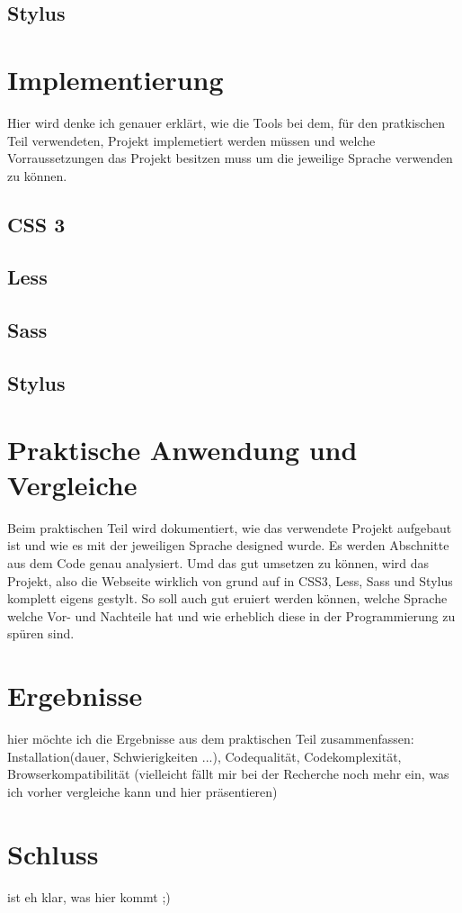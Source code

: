 \subsection{Stylus}

\section{Implementierung}
Hier wird denke ich genauer erklärt, wie die Tools bei dem, für den pratkischen Teil verwendeten, Projekt implemetiert werden müssen und welche  Vorraussetzungen das Projekt besitzen muss um die jeweilige Sprache verwenden zu können.

\subsection{CSS 3}

\subsection{Less}

\subsection{Sass}

\subsection{Stylus}


\section{Praktische Anwendung und Vergleiche}
Beim praktischen Teil wird dokumentiert, wie das verwendete Projekt aufgebaut ist und wie es mit der jeweiligen Sprache designed wurde. Es werden Abschnitte aus dem Code genau analysiert. Umd das gut umsetzen zu können, wird das Projekt, also die Webseite wirklich von grund auf in CSS3, Less, Sass und Stylus komplett eigens gestylt. So soll auch gut eruiert werden können, welche Sprache welche Vor- und Nachteile hat und wie erheblich diese in der Programmierung zu spüren sind. 

\section{Ergebnisse}
hier möchte ich die Ergebnisse aus dem praktischen Teil zusammenfassen: Installation(dauer, Schwierigkeiten ...), Codequalität, Codekomplexität, Browserkompatibilität (vielleicht fällt mir bei der Recherche noch mehr ein, was ich vorher vergleiche kann und hier präsentieren)

\section{Schluss}
ist eh klar, was hier kommt ;)




